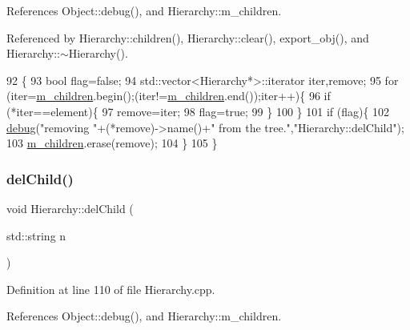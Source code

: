 References Object\+::debug(), and Hierarchy\+::m\+\_\+children.



Referenced by Hierarchy\+::children(), Hierarchy\+::clear(), export\+\_\+obj(), and Hierarchy\+::$\sim$\+Hierarchy().


\begin{DoxyCode}
92                                           \{
93   \textcolor{keywordtype}{bool} flag=\textcolor{keyword}{false};
94   std::vector<Hierarchy*>::iterator iter,\textcolor{keyword}{remove};
95   \textcolor{keywordflow}{for} (iter=\hyperlink{classHierarchy_a038816763941fd4a930504917f60483b}{m\_children}.begin();(iter!=\hyperlink{classHierarchy_a038816763941fd4a930504917f60483b}{m\_children}.end());iter++)\{
96     \textcolor{keywordflow}{if} (*iter==element)\{
97       \textcolor{keyword}{remove}=iter;
98       flag=\textcolor{keyword}{true};
99     \}
100   \}
101   \textcolor{keywordflow}{if} (flag)\{
102     \hyperlink{classObject_aac010553f022165573714b7014a15f0d}{debug}(\textcolor{stringliteral}{"removing "}+(*remove)->name()+\textcolor{stringliteral}{" from the tree."},\textcolor{stringliteral}{"Hierarchy::delChild"});
103     \hyperlink{classHierarchy_a038816763941fd4a930504917f60483b}{m\_children}.erase(\textcolor{keyword}{remove});
104   \}
105 \}
\end{DoxyCode}
\mbox{\label{classHierarchy_a1928ac7615fe0b5e55cd707f70dc6781}} 
\subsubsection{\texorpdfstring{del\+Child()}{delChild()}\hspace{0.1cm}{\footnotesize\ttfamily [2/2]}}
{\footnotesize\ttfamily void Hierarchy\+::del\+Child (\begin{DoxyParamCaption}\item[{std\+::string}]{n }\end{DoxyParamCaption})\hspace{0.3cm}{\ttfamily [inherited]}}



Definition at line 110 of file Hierarchy.\+cpp.



References Object\+::debug(), and Hierarchy\+::m\+\_\+children.


